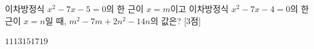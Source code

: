 이차방정식 $x^2-7x-5=0$의 한 근이 $x=m$이고 이차방정식 $x^2-7x-4=0$의 한 근이 $x=n$일 때, $m^2-7m+2n^2-14n$의 값은? \mbox{[3점]}
\begin{choices32}{$11$}{$13$}{$15$}{$17$}{$19$}\end{choices32}
